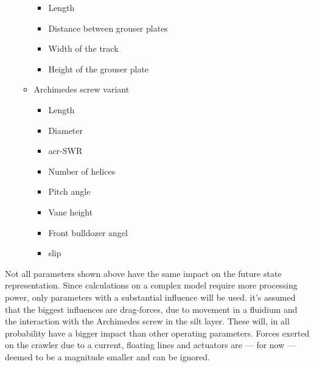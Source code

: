 \begin{itemize}
\begin{itemize}
\begin{itemize}
            \item Length\footnotemark[\getrefnumber{c}]
            \item Distance between grouser plates\footnotemark[\getrefnumber{c}]
            \item Width of the track\footnotemark[\getrefnumber{c}]
            \item Height of the grouser plate\footnotemark[\getrefnumber{c}]
        \end{itemize}
        \item Archimedes screw variant \cite{van_der_zee_prediction_2009}
        \begin{itemize}
            \setlength\itemsep{0mm}
            \item Length\footnotemark[\getrefnumber{c}]
            \item Diameter\footnotemark[\getrefnumber{c}]
            \item \gls{acr-SWR}\footnotemark[\getrefnumber{c}]
            \item Number of helices\footnotemark[\getrefnumber{c}]
            \item Pitch angle\footnotemark[\getrefnumber{c}]
            \item Vane height\footnotemark[\getrefnumber{c}]
            \item Front bulldozer angel\footnotemark[\getrefnumber{c}]
            \item slip
        \end{itemize}
    \end{itemize}
\end{itemize}

Not all parameters shown above have the same impact on the future state representation. Since calculations on a complex
model require more processing power, only parameters with a substantial influence will be used. it's assumed that the
biggest influences are drag-forces, due to movement in a fluidium and the interaction with the Archimedes screw in the
silt layer. These will, in all probability have a bigger impact than other operating parameters. Forces exerted on the
crawler due to a current, floating lines and actuators are --- for now --- deemed to be a magnitude smaller and can
be ignored.

